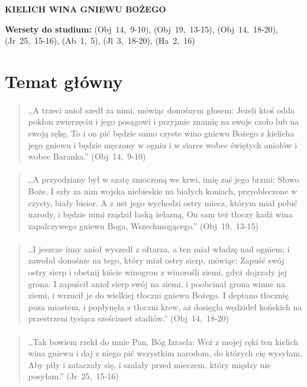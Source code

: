 \documentclass[10pt,a4paper,oneside]{article}
\begin{document}
\centerline{\textbf{\MakeUppercase{Kielich wina gniewu Bożego}}}
\begin{center}
\textbf{Wersety do studium:} 
\mbox{(Obj 14, 9-10)}, \mbox{(Obj 19, 13-15)}, \mbox{(Obj 14, 18-20)}, \mbox{(Jr 25, 15-16)}, \mbox{(Ab 1, 5)}, \mbox{(Jl 3, 18-20)}, \mbox{(Ha 2, 16)}
\end{center}
\section{Temat główny}
\paragraph{}
\begin{quote}
,,A trzeci anioł szedł za nimi, mówiąc donośnym głosem: Jeżeli ktoś odda pokłon zwierzęciu i jego posągowi i przyjmie znamię na swoje czoło lub na swoją rękę, To i on pić będzie samo czyste wino gniewu Bożego z kielicha jego gniewu i będzie męczony w ogniu i w siarce wobec świętych aniołów i wobec Baranka.'' \mbox{(Obj 14, 9-10)}
\end{quote}
\paragraph{}
\begin{quote}
,,A przyodziany był w szatę zmoczoną we krwi, imię zaś jego brzmi: Słowo Boże. I szły za nim wojska niebieskie na białych koniach, przyobleczone w czysty, biały bisior. A z ust jego wychodzi ostry miecz, którym miał pobić narody, i będzie nimi rządził laską żelazną, On sam też tłoczy kadź wina zapalczywego gniewu Boga, Wszechmogącego.'' \mbox{(Obj 19, 13-15)}
\end{quote}
\paragraph{}
\begin{quote}
,,I jeszcze inny anioł wyszedł z ołtarza, a ten miał władzę nad ogniem; i zawołał donośnie na tego, który miał ostry sierp, mówiąc: Zapuść swój ostry sierp i obetnij kiście winogron z winorośli ziemi, gdyż dojrzały jej grona. I zapuścił anioł sierp swój na ziemi, i poobcinał grona winne na ziemi, i wrzucił je do wielkiej tłoczni gniewu Bożego. I deptano tłocznię poza miastem, i popłynęła z tłoczni krew, aż dosięgła wędzideł końskich na przestrzeni tysiąca sześciuset stadiów.'' \mbox{(Obj 14, 18-20)}
\end{quote}
\paragraph{}
\begin{quote}
,,Tak bowiem rzekł do mnie Pan, Bóg Izraela: Weź z mojej ręki ten kielich wina gniewu i daj z niego pić wszystkim narodom, do których cię wysyłam, Aby piły i zataczały się, i szalały przed mieczem, który między nie posyłam.'' \mbox{(Jr 25, 15-16)}
\end{quote}
\end{document}
